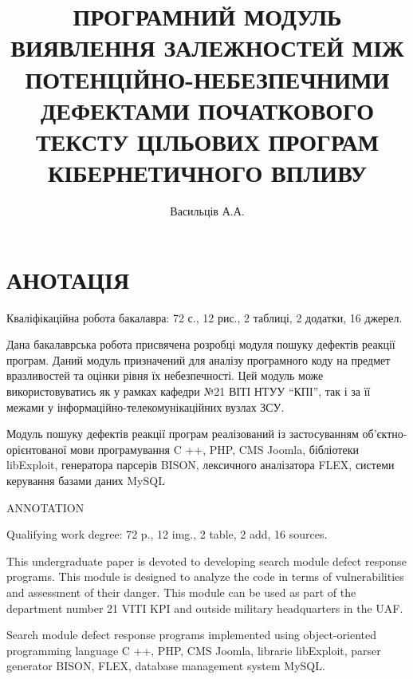 \documentclass[oneside,final,14pt]{extreport}
\title{ПРОГРАМНИЙ МОДУЛЬ ВИЯВЛЕННЯ ЗАЛЕЖНОСТЕЙ МІЖ ПОТЕНЦІЙНО-НЕБЕЗПЕЧНИМИ ДЕФЕКТАМИ ПОЧАТКОВОГО ТЕКСТУ ЦІЛЬОВИХ ПРОГРАМ КІБЕРНЕТИЧНОГО ВПЛИВУ}
\author{Васильців А.А.}
\begin{document}
\maketitle %

\chapter*{АНОТАЦІЯ}
\label{0annotation:annotation}
Кваліфікаційна робота бакалавра: 72  с., 12  рис., 2  таблиці, 2 додатки, 16 джерел.

Дана бакалаврська робота присвячена розробці модуля пошуку дефектів реакції програм. Даний модуль призначений для аналізу програмного коду на предмет вразливостей та оцінки рівня їх небезпечності. Цей модуль може використовуватись як у рамках  кафедри №21 ВІТІ НТУУ “КПІ”, так і за її межами у інформаційно-телекомунікаційних вузлах ЗСУ.

Модуль пошуку дефектів реакції програм  реалізований із застосуванням об’єктно-орієнтованої мови програмування  C ++, PHP, CMS Joomla, бібліотеки libExploit, генератора парсерів BISON, лексичного аналізатора FLEX, системи керування базами даних MySQL 


ANNOTATION
\normalfont


Qualifying work degree: 72 p., 12 img., 2 table, 2 add, 16 sources.

This undergraduate paper is devoted to developing search module defect response programs. This module is designed to analyze the code in terms of vulnerabilities and assessment of their danger. This module can be used as part of the department number 21 VITI KPI and outside military headquarters in the UAF.

Search module defect response programs implemented using object-oriented programming language C ++, PHP, CMS Joomla, librarie libExploit, parser generator BISON, FLEX, database management system MySQL.
\pagebreak

\setcounter{tocdepth}{1}
\tableofcontents %
\newpage %
\end{document}
